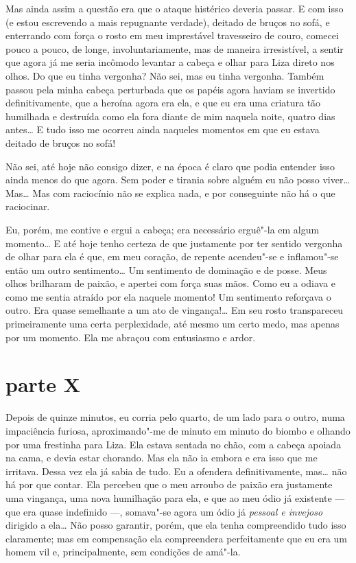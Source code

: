 Mas ainda assim a questão era que o ataque histérico deveria passar. E
com isso (e estou escrevendo a mais repugnante verdade), deitado de
bruços no sofá, e enterrando com força o rosto em meu imprestável
travesseiro de couro, comecei pouco a pouco, de longe,
involuntariamente, mas de maneira irresistível, a sentir que agora já
me seria incômodo levantar a cabeça e olhar para Liza direto nos olhos.
Do que eu tinha vergonha? Não sei, mas eu tinha vergonha. Também passou
pela minha cabeça perturbada que os papéis agora haviam se invertido
definitivamente, que a heroína agora era ela, e que eu era uma criatura
tão humilhada e destruída como ela fora diante de mim naquela noite,
quatro dias antes\ldots{} E tudo isso me ocorreu ainda naqueles momentos em
que eu estava deitado de bruços no sofá!


Não sei, até hoje não consigo dizer, e na época é claro que podia
entender isso ainda menos do que agora. Sem poder e tirania sobre
alguém eu não posso viver\ldots{} Mas\ldots{} Mas com raciocínio não se explica
nada, e por conseguinte não há o que raciocinar.

Eu, porém, me contive e ergui a cabeça; era necessário erguê"-la em algum
momento\ldots{} E até hoje tenho certeza de que justamente por ter sentido
vergonha de olhar para ela é que, em meu coração, de repente acendeu"-se
e inflamou"-se então um outro sentimento\ldots{} Um sentimento de dominação e
de posse. Meus olhos brilharam de paixão, e apertei com força suas
mãos. Como eu a odiava e como me sentia atraído por ela naquele
momento! Um sentimento reforçava o outro. Era quase semelhante a um ato
de vingança!\ldots{} Em seu rosto transpareceu primeiramente uma certa
perplexidade, até mesmo um certo medo, mas apenas por um momento. Ela
me abraçou com entusiasmo e ardor.


\section{parte X}

Depois de quinze minutos, eu corria pelo quarto, de um lado para o outro, numa
impaciência furiosa, aproximando"-me de minuto em minuto do biombo e olhando por
uma frestinha para Liza. Ela estava sentada no chão, com a cabeça apoiada na
cama, e devia estar chorando. Mas ela não ia embora e era isso que me irritava.
Dessa vez ela já sabia de tudo.  Eu a ofendera definitivamente, mas\ldots{} não
há por que contar. Ela percebeu que o meu arroubo de paixão era justamente uma
vingança, uma nova humilhação para ela, e que ao meu ódio já existente --- que
era quase indefinido ---, somava"-se agora um ódio já \textit{pessoal e
invejoso} dirigido a ela\ldots{} Não posso garantir, porém, que ela tenha
compreendido tudo isso claramente; mas em compensação ela compreendera
perfeitamente que eu era um homem vil e, principalmente, sem condições de
amá"-la.

